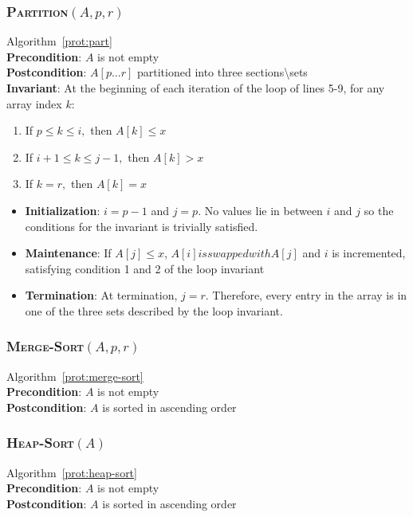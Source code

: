 \documentclass[onecolumn, letterpaper, 12pt]{article}
\begin{document}
		\subsubsection{\textsc{Partition}$(A, p, r)$}
			\footnotesize
			Algorithm~\ref{prot:part}\\
			\textbf{Precondition}: $A$ is not empty\\
			\textbf{Postcondition}: $A[p...r]$ partitioned into three sections\textbackslash sets\\
			\textbf{Invariant}: At the beginning of each iteration of the loop of lines 5-9, for any array index $k$:
			\begin{enumerate}
				\item If $p \le k\le i,$ then $A[k] \le x$
				\item If $i+1\le k\le j-1,$ then $A[k] > x$
				\item If $k=r,$ then $A[k]=x$
			\end{enumerate}
			\begin{itemize}
				\item \textbf{Initialization}: $i = p-1$ and $j=p$. No values lie in between $i$ and $j$ so the conditions for the invariant is trivially satisfied.
				\item \textbf{Maintenance}: If $A[j]\le x$, $A[i] is swapped with A[j]$ and $i$ is incremented, satisfying condition 1 and 2 of the loop invariant
				\item \textbf{Termination}: At termination, $j=r$. Therefore, every entry in the array is in one of the three sets described by the loop invariant.
			\end{itemize}
			\normalsize
		\subsubsection{\textsc{Merge-Sort}$(A, p, r)$}
			\footnotesize
			Algorithm~\ref{prot:merge-sort}\\
			\textbf{Precondition}: $A$ is not empty\\
			\textbf{Postcondition}: $A$ is sorted in ascending order
			\normalsize
		\subsubsection{\textsc{Heap-Sort}$(A)$}
			\footnotesize
			Algorithm~\ref{prot:heap-sort}\\
			\textbf{Precondition}: $A$ is not empty\\
			\textbf{Postcondition}: $A$ is sorted in ascending order
			\normalsize
\end{document}
